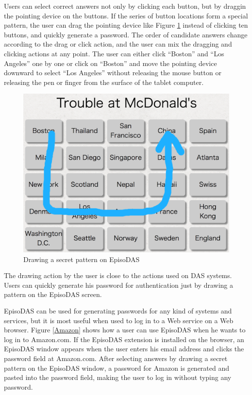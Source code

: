 \documentclass[sigconf]{acmart}
\begin{document}
Users can select correct answers not only by clicking each button,
but by draggin the pointing device on the buttons.
%
If the series of button locations form a special pattern,
the user can drag the pointing device like
Figure \ref{draw} instead of clicking ten buttons,
and quickly generate a password.
%
The order of candidate answers change according to the drag or click action,
and the user can mix the dragging and clicking actions
at any point.
The user can either click ``Boston'' and ``Los Angeles'' one by one or
click on ``Boston'' and move the pointing device downward to select
``Los Angeles'' without releasing the mouse button or releasing the
pen or finger from the surface of the tablet computer.

\begin{figure}[H]
  \includegraphics[width=12cm,bb=0 0 1356 1046]{figures/draw.png}
  \caption{Drawing a secret pattern on EpisoDAS}
  \label{draw}
\end{figure}

The drawing action by the user is close to the actions
used on DAS systems.
Users can quickly generate his password for authentication
just by drawing a pattern on the EpisoDAS screen.

EpisoDAS can be used for generating passwords for any kind of systems and
services, but it is most useful when used to log in to a Web service
on a Web browser.
Figure \ref{Amazon} shows how a user can use EpisoDAS when
he wants to log in to Amazon.com.
If the EpisoDAS extension is installed on the browser,
an EpisoDAS window appears when the user enters his
email address and clicks the password field at Amazon.com.
After selecting answers by drawing a secret pattern on the EpisoDAS window,
a password for Amazon is generated and pasted
into the password field, making the user to log in without typing any password.
\end{document}
